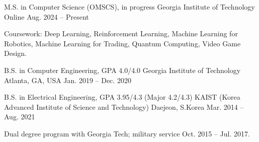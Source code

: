 

\begin{cventries}

  \cventry
    {M.S. in Computer Science (OMSCS), in progress} %
    {Georgia Institute of Technology} %
    {Online} %
    {Aug. 2024 -- Present} %
    {
      \begin{cvitems}
        \item {Coursework: Deep Learning, Reinforcement Learning, Machine Learning for Robotics, Machine Learning for Trading, Quantum Computing, Video Game Design.}
      \end{cvitems}
    }

  \cventry
    {B.S. in Computer Engineering, GPA 4.0/4.0} %
    {Georgia Institute of Technology} %
    {Atlanta, GA, USA} %
    {Jan. 2019 -- Dec. 2020} %
    {}

  \cventry
    {B.S. in Electrical Engineering, GPA 3.95/4.3 (Major 4.2/4.3)} %
    {KAIST (Korea Advanced Institute of Science and Technology)} %
    {Daejeon, S.Korea} %
    {Mar. 2014 -- Aug. 2021} %
    {
      \begin{cvitems}
        \item {Dual degree program with Georgia Tech; military service Oct. 2015 -- Jul. 2017.}
      \end{cvitems}
    }

\end{cventries}

